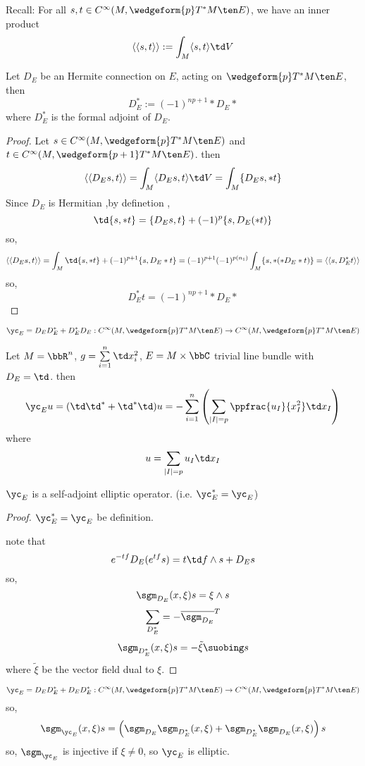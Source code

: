 Recall: For all $s,t\in C^\infty(M,\wedgeform{p}T^*M\ten E)$, 
we have an inner product 
$$\langle\langle s,t\rangle\rangle
:=\int_M\langle s,t\rangle\td V
$$

\begin{thm}
Let $D_E$ be an Hermite connection on $E$, 
acting on $\wedgeform{p}T^*M\ten E$, then 
$$D_E^*:=(-1)^{np+1}*D_E*$$
where $D^*_E$ is the formal adjoint of $D_E$.
\end{thm}

\begin{proof}
Let $s\in C^\infty(M,\wedgeform{p}T^*M\ten E)$ and 
$t\in C^\infty(M,\wedgeform{p+1}T^*M\ten E)$. then 
$$
  \langle\langle D_Es,t\rangle\rangle
 =\int_M
    \langle
      D_Es,t
    \rangle
    \td V
 =
  \int_M
    \{D_Es,*t\}
$$
Since $D_E$ is Hermitian ,by definetion ,
$$\td\{s,*t\}=\{D_Es,t\}+(-1)^p\{s,D_E(*t)\}$$
so,
$$
  \langle\langle D_Es,t\rangle\rangle
=
  \int_M\td\{s,*t\}
  +(-1)^{p+1}
   \{s,D_E*t\}
=
  (-1)^{p+1}(-1)^{p(n_1)}
  \int_M
    \{s,*(*D_E*t)\}
=
  \langle\langle s,D_E^*t\rangle\rangle
$$ 
so,
$$D_E^*t=(-1)^{np+1}*D_E*$$
\end{proof}

\begin{definition}
$$\yc_E=D_ED_E^*+D_E^*D_E:
C^\infty(M,\wedgeform{p}T^*M\ten E)
\to
C^\infty(M,\wedgeform{p}T^*M\ten E)
$$
\end{definition}

\begin{example}
Let $M=\bbR^n$, $g=\sum\limits_{i=1}^n\td x_i^2$,
$E=M\times \bbC$ trivial line bundle with $D_E=\td$.
then 
$$\yc_Eu=(\td\td^*+\td^*\td)u=
-\sum_{i=1}^n
  \left(
    \sum_{|I|=p}
    \ppfrac{u_I}{x_I^2}
    \td x_I
  \right)
$$
where 
$$u=\sum_{|I|=p}u_I\td x_I$$
\end{example}

\begin{prop}
$\yc_E$ is a self-adjoint elliptic operator.
(i.e. $\yc_E^*=\yc_E$)
\end{prop}
\begin{proof}
$\yc_E^*=\yc_E$ be definition.

note that 
$$e^{-tf}D_E(e^{tf}s)=t\td f\wedge s+D_Es$$
so,
$$\sgm_{D_E}(x,\xi)s=\xi\wedge s$$
$$\sum_{D^*_E}=-\overline{\sgm_{D_E}}^T$$
$$\sgm_{D^*_E}(x,\xi)s=-\tilde{\xi}\suobing s$$
where $\tilde{\xi}$ be the vector field dual to $\xi$.
\end{proof}

\begin{definition}
$$\yc_E=D_ED_E^*+D_ED_E^*:
C^\infty(M,\wedgeform{p}T^*M\ten E)\to 
C^\infty(M,\wedgeform{p}T^*M\ten E)$$
so,
$$\sgm_{\yc_E}(x,\xi)s=
 \left(
   \sgm_{D_E}\sgm_{D_E^*}(x,\xi)
   +\sgm_{D_E^*}\sgm_{D_E}(x,\xi)
 \right)s
$$
so,
$\sgm_{\yc_E}$ is injective if $\xi\neq 0$, so $\yc_E$ is elliptic.
\end{definition}

